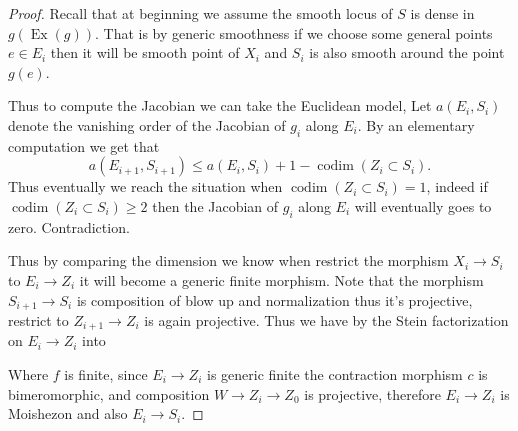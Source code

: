 \documentclass[11pt]{article}
\theoremstyle{definition}
\begin{document}
\begin{proof}
	Recall that at beginning we assume the smooth locus of $S$ is dense in $g(\operatorname{Ex}(g))$. That is by generic smoothness if we choose some general points $e\in E_i$ then it will be smooth point of $X_i$ and $S_i$ is also smooth around the point $g(e)$.
	
	Thus to compute the Jacobian we can take the Euclidean model, Let $a\left(E_i, S_i\right)$ denote the vanishing order of the Jacobian of $g_i$ along $E_i$. By an elementary computation we get that
	$$
	a\left(E_{i+1}, S_{i+1}\right) \leq a\left(E_i, S_i\right)+1-\operatorname{codim}\left(Z_i \subset S_i\right) .
	$$
	Thus eventually we reach the situation when $\operatorname{codim}\left(Z_i \subset S_i\right)=1$, indeed if $\operatorname{codim}\left(Z_i \subset S_i\right)\ge 2$ then the Jacobian of $g_i$ along $E_i$ will eventually goes to zero. Contradiction.
	
	Thus by comparing the dimension we know when restrict the morphism $X_i\to S_i$ to $E_i\to Z_i$ it will become a generic finite morphism. Note that the morphism $S_{i+1}\to S_{i}$ is composition of blow up and normalization thus it's projective, restrict to $Z_{i+1}\to Z_i$ is again projective. Thus we have by the Stein factorization on $E_i \to Z_i$ into 
	\begin{center}
	\end{center}
	Where $f$ is finite, since $E_i\to Z_i$ is generic finite the contraction morphism $c$ is bimeromorphic, and composition $W\to Z_i\to Z_0$ is projective, therefore $E_i \rightarrow Z_i$ is Moishezon and also $E_i\to S_i$.
	\end{proof}
	
\end{document}
